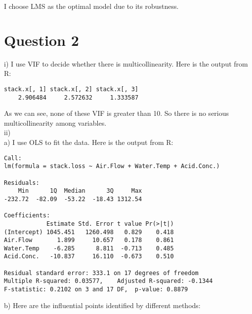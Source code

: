 \documentclass[12pt]{article}
\begin{document}
I choose LMS as the optimal model due to its robustness.

\section*{Question 2}

i) I use VIF to decide whether there is multicollinearity. Here is the
output from R:

\begin{verbatim}
stack.x[, 1] stack.x[, 2] stack.x[, 3] 
    2.906484     2.572632     1.333587 
\end{verbatim}

As we can see, none of these VIF is greater than 10. So there is no
serious multicollinearity among variables. \\

ii) \\
a) I use OLS to fit the data. Here is the output from R:

\begin{verbatim}
Call:
lm(formula = stack.loss ~ Air.Flow + Water.Temp + Acid.Conc.)

Residuals:
    Min      1Q  Median      3Q     Max 
-232.72  -82.09  -53.22  -18.43 1312.54 

Coefficients:
            Estimate Std. Error t value Pr(>|t|)
(Intercept) 1045.451   1260.498   0.829    0.418
Air.Flow       1.899     10.657   0.178    0.861
Water.Temp    -6.285      8.811  -0.713    0.485
Acid.Conc.   -10.837     16.110  -0.673    0.510

Residual standard error: 333.1 on 17 degrees of freedom
Multiple R-squared: 0.03577,	Adjusted R-squared: -0.1344 
F-statistic: 0.2102 on 3 and 17 DF,  p-value: 0.8879 
\end{verbatim}

b) Here are the influential points identified by different methods:
\end{document}
